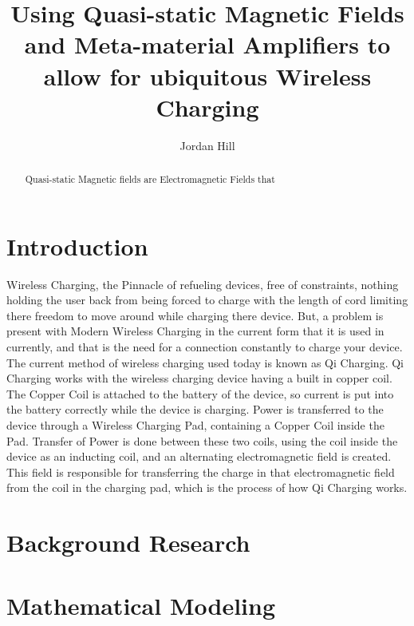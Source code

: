 \documentclass[]{article}
\title{Using Quasi-static Magnetic Fields and Meta-material Amplifiers to allow for ubiquitous Wireless Charging}
\author{Jordan Hill}
\begin{document}
	
\maketitle
	
\begin{abstract}
	Quasi-static Magnetic fields are Electromagnetic Fields that
\end{abstract}
	
\section{Introduction}
	Wireless Charging, the Pinnacle of refueling devices, free of constraints, nothing holding the user back from being forced to charge with the length of cord limiting there freedom to move around while charging there device. But, a problem is present with Modern Wireless Charging in the current form that it is used in currently, and that is the need for a connection constantly to charge your device. The current method of wireless charging used today is known as Qi Charging. Qi Charging works with the wireless charging device having a built in copper coil. The Copper Coil is attached to the battery of the device, so current is put into the battery correctly while the device is charging. Power is transferred to the device through a Wireless Charging Pad, containing a Copper Coil inside the Pad. Transfer of Power is done between these two coils, using the coil inside the device as an inducting coil, and an alternating electromagnetic field is created. This field is responsible for transferring the charge in that electromagnetic field from the coil in the charging pad, which is the process of how Qi Charging works.
\section{Background Research}
	
\section{Mathematical Modeling}
	
\end{document}

